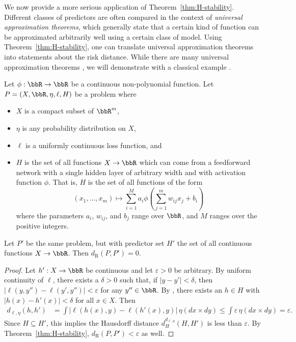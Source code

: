 \documentclass[twoside,11pt]{article}
\newcommand{\dexp}[1][]{d_{\mathrm{R}#1}}
\renewcommand{\epsilon}{\varepsilon}
\begin{document}
    We now provide a more serious application of Theorem~\ref{thm:H-stability}. Different classes of predictors are often compared in the context of \emph{universal approximation theorems}, which generally state that a certain kind of function can be approximated arbitrarily well using a certain class of model. Using Theorem~\ref{thm:H-stability}, one can translate universal approximation theorems into statements about the risk distance. While there are many universal approximation theorems \citep{pinkus_approximation_1999}, we will demonstrate with a classical example \citep[see][]{leshno_multilayer_1993}.
    
    \begin{proposition}
        Let $\phi:\bbR \to \bbR$ be a continuous non-polynomial function. Let $P = (X, \bbR, \eta, \ell, H)$ be a problem where
        \begin{itemize}
            \item $X$ is a compact subset of $\bbR^m$,
            \item $\eta$ is any probability distribution on $X$,
            \item $\ell$ is a uniformly continuous loss function, and
            \item $H$ is the set of all functions $X\to \bbR$ which can come from a feedforward network with a single hidden layer of arbitrary width and with activation function $\phi$. That is, $H$ is the set of all functions of the form
            \[(x_1,\dots,x_m) \mapsto \sum_{i=1}^M a_i \phi\left(\sum_{j=1}^m w_{ij} x_j + b_i\right)\]
            where the parameters $a_i$, $w_{ij}$, and $b_j$ range over $\bbR$, and $M$ ranges over the positive integers.
        \end{itemize}
        Let $P'$ be the same problem, but with predictor set $H'$ the set of all continuous functions $X \to \bbR$. Then $\dexp(P,P') = 0$.
    \end{proposition}
    \begin{proof}
        Let $h':X\to \bbR$ be continuous and let $\epsilon >0$ be arbitrary. By uniform continuity of $\ell$, there exists a $\delta > 0$ such that, if $|y-y'|<\delta$, then $|\ell(y,y'')-\ell(y',y'')|<\epsilon$ for any $y''\in \bbR$. By \cite[Thm 1]{leshno_multilayer_1993}, there exists an $h\in H$ with $|h(x) - h'(x)| < \delta$ for all $x\in X$. Then
        \begin{align*}
            d_{\ell,\eta}(h,h') & = \int \big| \ell(h(x),y) - \ell(h'(x),y) \big| \, \eta(dx {\times} dy)
            \leq \int \epsilon\, \eta(dx{\times}dy) = \epsilon.
        \end{align*}
        Since $H \subseteq H'$, this implies the Hausdorff distance $d_H^{d_{\ell,\eta}}(H,H')$ is less than $\epsilon$. By Theorem~\ref{thm:H-stability}, $\dexp(P,P')<\epsilon$ as well.
    \end{proof}
\end{document}
